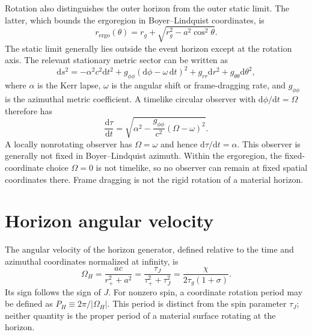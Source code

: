 \documentclass[12pt]{article}
\begin{document}
Rotation also distinguishes the outer horizon from the outer static limit. The latter, which bounds the ergoregion in Boyer--Lindquist coordinates, is
\begin{equation}
  r_{\mathrm{ergo}}(\theta)
  =r_g+\sqrt{r_g^2-a^2\cos^2\theta}.
  \label{eq:ergosurface}
\end{equation}
The static limit generally lies outside the event horizon except at the rotation axis. The relevant stationary metric sector can be written as \cite{BardeenPressTeukolsky}
\begin{equation}
  \mathrm{d}s^2=-\alpha^2c^2\mathrm{d}t^2
    +g_{\phi\phi}(\mathrm{d}\phi-\omega\,\mathrm{d}t)^2
    +g_{rr}\mathrm{d}r^2+g_{\theta\theta}\mathrm{d}\theta^2,
  \label{eq:kerr-stationary-metric}
\end{equation}
where $\alpha$ is the Kerr lapse, $\omega$ is the angular shift or frame-dragging rate, and $g_{\phi\phi}$ is the azimuthal metric coefficient. A timelike circular observer with $\mathrm{d}\phi/\mathrm{d}t=\Omega$ therefore has
\begin{equation}
  \frac{\mathrm{d}\tau}{\mathrm{d}t}
  =\sqrt{\alpha^2-\frac{g_{\phi\phi}}{c^2}(\Omega-\omega)^2}.
  \label{eq:kerr-circular-rate}
\end{equation}
A locally nonrotating observer has $\Omega=\omega$ and hence $\mathrm{d}\tau/\mathrm{d}t=\alpha$. This observer is generally not fixed in Boyer--Lindquist azimuth. Within the ergoregion, the fixed-coordinate choice $\Omega=0$ is not timelike, so no observer can remain at fixed spatial coordinates there. Frame dragging is not the rigid rotation of a material horizon.

\section{Horizon angular velocity}

The angular velocity of the horizon generator, defined relative to the time and azimuthal coordinates normalized at infinity, is \cite{BardeenPressTeukolsky,BardeenCarterHawking}
\begin{equation}
  \Omega_H
  =\frac{ac}{r_+^2+a^2}
  =\frac{\tau_J}{\tau_+^2+\tau_J^2}
  =\frac{\chi}{2\tau_g(1+\sigma)}.
  \label{eq:horizon-angular-velocity}
\end{equation}
Its sign follows the sign of $J$. For nonzero spin, a coordinate rotation period may be defined as $P_H\equiv2\pi/|\Omega_H|$. This period is distinct from the spin parameter $\tau_J$; neither quantity is the proper period of a material surface rotating at the horizon.
\end{document}
